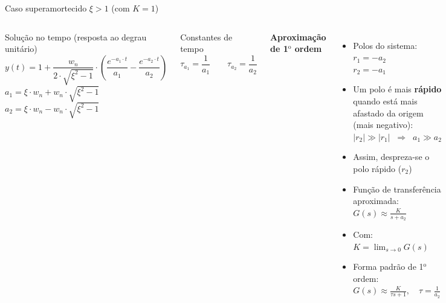 \begin{frame}{Caso superamortecido $\xi>1$ (com $K=1$)}
  \begin{columns}
    \begin{block}{Solução no tempo (resposta ao degrau unitário)}
      \begin{equation*}
        y(t) = 1 + \frac{w_n}{2\cdot \sqrt{\xi^2 - 1}}\cdot\left(\frac{e^{-a_1\cdot t}}{a_1} - \frac{e^{-a_2\cdot t}}{a_2}\right)
      \end{equation*}
      $a_1 = \xi \cdot w_n + w_n\cdot\sqrt{\xi^2 - 1}$
      $a_2 = \xi \cdot w_n - w_n\cdot\sqrt{\xi^2 - 1}$
    \end{block}
    \begin{block}{Constantes de tempo}
      \begin{equation*}
        \tau_{a_1} = \frac{1}{a_1} \qquad \tau_{a_2} = \frac{1}{a_2}
      \end{equation*}
    \end{block}
    \scriptsize
    \textbf{Aproximação de 1$^\text{o}$ ordem}
    \begin{itemize}
      \item Polos do sistema: \\
            $r_1 = -a_2$ \\
            $r_2 = -a_1$
      \item Um polo é mais \textbf{rápido} quando está mais afastado da origem (mais negativo): \\
            $|r_2| \gg |r_1| \;\;\Rightarrow\;\; a_1 \gg a_2$
      \item Assim, despreza-se o polo rápido ($r_2$)
      \item Função de transferência aproximada:
            $G(s) \approx \frac{K}{s + a_2}$
      \item Com:
            $K = \lim_{s \to 0} G(s)$
      \item Forma padrão de 1$^\text{o}$ ordem:
            $G(s) \approx \frac{K}{\tau s + 1}, \quad \tau = \frac{1}{a_2}$
    \end{itemize}
  \end{columns}
\end{frame}

